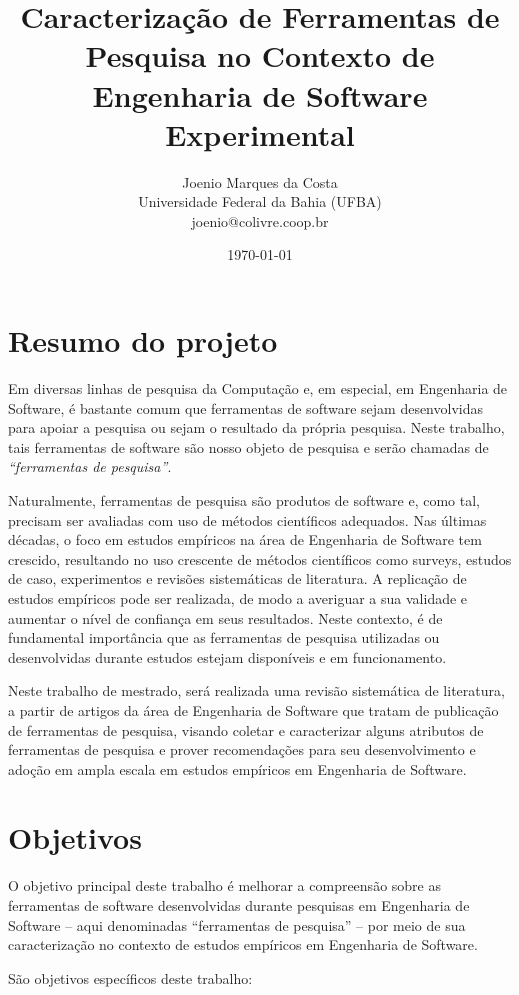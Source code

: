 \documentclass[12pt]{article}
\title{
  Caracterização de Ferramentas de Pesquisa no Contexto de Engenharia de
  Software Experimental
}
\author{Joenio Marques da Costa\\
  {\small Universidade Federal da Bahia (UFBA)} \\
  {\small joenio@colivre.coop.br}
}
\date{\today}
\begin{document}
\maketitle

\section{Resumo do projeto}


Em diversas linhas de pesquisa da Computação e, em especial, em Engenharia de
Software, é bastante comum que ferramentas de software sejam desenvolvidas
para apoiar a pesquisa ou sejam o resultado da própria pesquisa. Neste
trabalho, tais ferramentas de software são nosso objeto de pesquisa e serão
chamadas de {\it “ferramentas de pesquisa”}.

Naturalmente, ferramentas de pesquisa são produtos de software e, como tal,
precisam ser avaliadas com uso de métodos científicos adequados. Nas últimas
décadas, o foco em estudos empíricos na área de Engenharia de Software tem
crescido, resultando no uso crescente de métodos científicos como surveys,
estudos de caso, experimentos e revisões sistemáticas de literatura. A
replicação de estudos empíricos pode ser realizada, de modo a averiguar a sua
validade e aumentar o nível de confiança em seus resultados. Neste contexto, é
de fundamental importância que as ferramentas de pesquisa utilizadas ou
desenvolvidas durante estudos estejam disponíveis e em funcionamento.

Neste trabalho de mestrado, será realizada uma revisão sistemática de
literatura, a partir de artigos da área de Engenharia de Software que tratam
de publicação de ferramentas de pesquisa, visando coletar e caracterizar
alguns atributos de ferramentas de pesquisa e prover recomendações para seu
desenvolvimento e adoção em ampla escala em estudos empíricos em Engenharia de
Software.

\section{Objetivos}

O objetivo principal deste trabalho é melhorar a compreensão sobre as
ferramentas de software desenvolvidas durante pesquisas em Engenharia de
Software -- aqui denominadas “ferramentas de pesquisa” -- por meio de sua
caracterização no contexto de estudos empíricos em Engenharia de Software. 

São objetivos específicos deste trabalho:
\end{document}
